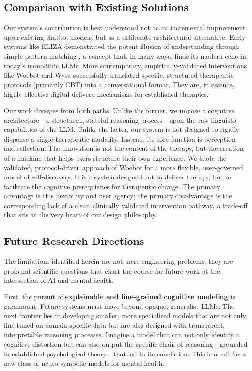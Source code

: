 \subsection{Comparison with Existing Solutions}

Our system's contribution is best understood not as an incremental improvement upon existing chatbot models, but as a deliberate architectural alternative. Early systems like ELIZA demonstrated the potent illusion of understanding through simple pattern matching \cite{weizenbaum1966eliza}, a concept that, in many ways, finds its modern echo in today's monolithic LLMs. More contemporary, empirically-validated interventions like Woebot \cite{fitzpatrick2017delivering} and Wysa \cite{inkster2018empathy} successfully translated specific, structured therapeutic protocols (primarily CBT) into a conversational format. They are, in essence, highly effective digital delivery mechanisms for established therapies.

Our work diverges from both paths. Unlike the former, we impose a cognitive architecture—a structured, stateful reasoning process—upon the raw linguistic capabilities of the LLM. Unlike the latter, our system is not designed to rigidly dispense a single therapeutic modality. Instead, its core function is perception and reflection. The innovation is not the content of the therapy, but the creation of a machine that helps users structure their own experience. We trade the validated, protocol-driven approach of Woebot for a more flexible, user-governed model of self-discovery. It is a system designed not to deliver therapy, but to facilitate the cognitive prerequisites for therapeutic change. The primary advantage is this flexibility and user agency; the primary disadvantage is the corresponding lack of a clear, clinically validated intervention pathway, a trade-off that sits at the very heart of our design philosophy.

\subsection{Future Research Directions}

The limitations identified herein are not mere engineering problems; they are profound scientific questions that chart the course for future work at the intersection of AI and mental health.

First, the pursuit of \textbf{explainable and fine-grained cognitive modeling} is paramount. Future systems must move beyond opaque, generalist LLMs. The next frontier lies in developing smaller, more specialized models that are not only fine-tuned on domain-specific data but are also designed with transparent, interpretable reasoning processes. Imagine a model that can not only identify a cognitive distortion but can also output the specific chain of reasoning—grounded in established psychological theory—that led to its conclusion. This is a call for a new class of neuro-symbolic models for mental health.

